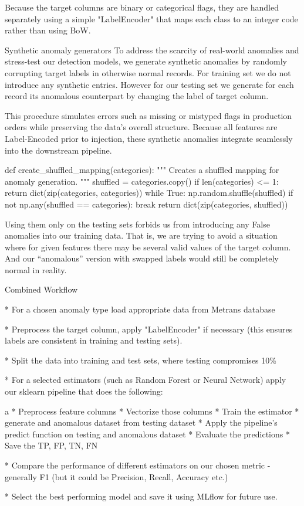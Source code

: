 Because the target columns are binary or categorical flags, they are handled separately using a simple "LabelEncoder" that maps each class to an integer code rather than using BoW.

\secc Synthetic anomaly generators
To address the scarcity of real-world anomalies and stress-test our detection models, we generate synthetic anomalies by randomly corrupting target labels in otherwise normal records. For training set we do not introduce any synthetic entries. However for our testing set we generate for each record its anomalous counterpart by changing the label of target column.

This procedure simulates errors such as missing or mistyped flags in production orders while preserving the data’s overall structure. Because all features are Label-Encoded prior to injection, these synthetic anomalies integrate seamlessly into the downstream pipeline.

\begtt {}
def create_shuffled_mapping(categories):
    """
    Creates a shuffled mapping for anomaly generation.
    """
    shuffled = categories.copy()
    if len(categories) <= 1:
        return dict(zip(categories, categories))
    while True:
        np.random.shuffle(shuffled)
        if not np.any(shuffled == categories):
            break
    return dict(zip(categories, shuffled))
\endtt

Using them only on the testing sets forbids us from introducing any False anomalies into our training data. That is, we are trying to avoid a situation where for given features there may be several valid values of the target column. And our ``anomalous'' version with swapped labels would still be completely normal in reality.

\secc Combined Workflow

\begitems
* For a chosen anomaly type load appropriate data from Metrans database

* Preprocess the target column, apply "LabelEncoder" if necessary (this ensures labels are consistent in training and testing sets).

* Split the data into training and test sets, where testing compromises 10\%

* For a selected estimators (such as Random Forest or Neural Network) apply our sklearn pipeline that does the following:

\begitems \style a
* Preprocess feature columns
* Vectorize those columns
* Train the estimator
* generate and anomalous dataset from testing dataset
* Apply the pipeline's predict function on testing and anomalous dataset
* Evaluate the predictions
* Save the TP, FP, TN, FN
\enditems

* Compare the performance of different estimators on our chosen metric - generally 
 F1 (but it could be Precision, Recall, Accuracy etc.)

 * Select the best performing model and save it using MLflow for future use.
\enditems
